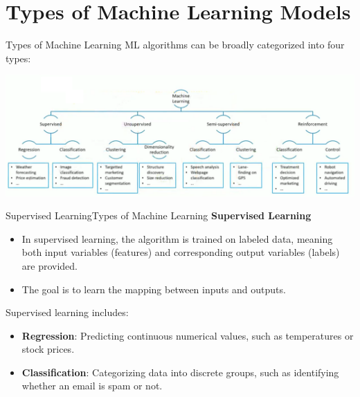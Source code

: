 \documentclass[11pt]{beamer}
\begin{document}
\section{Types of Machine Learning Models}
\begin{frame}{Types of Machine Learning}
ML algorithms can be broadly categorized into four types:

	\begin{center}
	\includegraphics[scale=0.35]{../05-pictures/lesson-1-1_pic_19.png}
	\end{center}
\end{frame}
\begin{frame}{Supervised Learning}{Types of Machine Learning}
\textbf{Supervised Learning}

	\begin{itemize}
		\item In supervised learning, the algorithm is trained on labeled data, meaning both input variables (features) and corresponding output variables (labels) are provided. 

		\item The goal is to learn the mapping between inputs and outputs. 

	\end{itemize}


Supervised learning includes:

	\begin{itemize}
		\item \textbf {Regression}: Predicting continuous numerical values, such as temperatures or stock prices.

		\item \textbf {Classification}: Categorizing data into discrete groups, such as identifying whether an email is spam or not.

	\end{itemize}
\end{frame}
\end{document}
